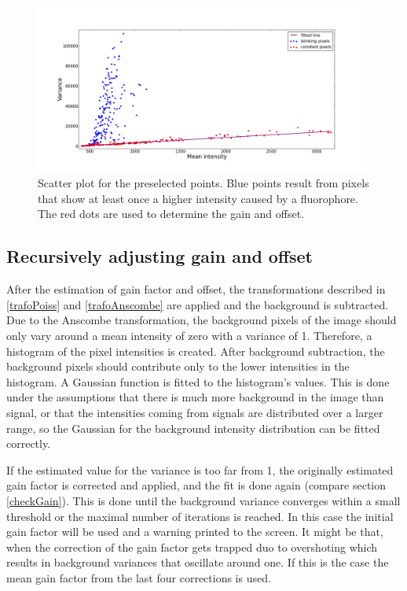 \begin{figure}
\centering
\includegraphics[width = 0.99\textwidth]{pictures/skellamplot.png}
	\caption{Scatter plot for the preselected points. Blue points result from pixels that show at least once a higher intensity caused by a fluorophore. The red dots are used to determine the gain and offset.}
	\label{skellamplot}
\end{figure}
\subsection{Recursively adjusting gain and offset}
After the estimation of gain factor and offset, the transformations described in \ref{trafoPoiss} and \ref{trafoAnscombe} are applied and the background is subtracted.\newline
Due to the Anscombe transformation, the background pixels of the image should only vary around a mean intensity of zero with a variance of 1. Therefore, a histogram of the pixel intensities is created. After background subtraction, the background pixels should contribute only to the lower intensities in the histogram. A Gaussian function is fitted to the histogram's values. This is done under the assumptions that there is much more background in the image than signal, or that the intensities coming from signals are distributed over a larger range, so the Gaussian for the background intensity distribution can be fitted correctly.\newline


If the estimated value for the variance is too far from 1, the originally estimated gain factor is corrected and applied, and the fit is done again (compare section \ref{checkGain}). This is done until the background variance converges within a small threshold or the maximal number of iterations is reached. In this case the initial gain factor will be used and a warning printed to the screen.\newline
It might be that, when the correction of the gain factor gets trapped duo to overshoting which results in background variances that oscillate around one. If this is the case the mean gain factor from the last four corrections is used.
